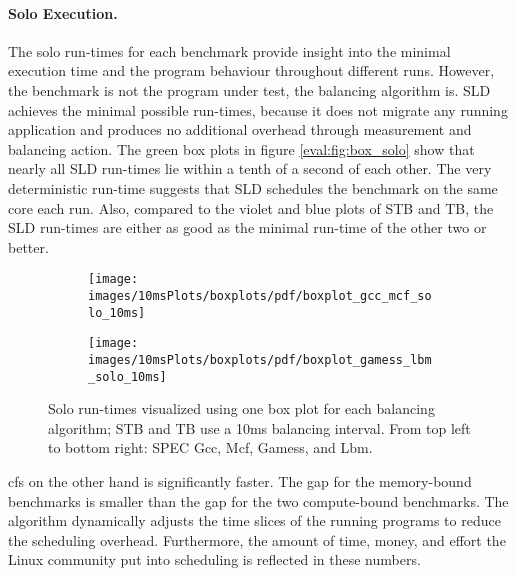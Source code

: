 \paragraph{Solo Execution.}
The solo run-times for each benchmark provide insight into the minimal
execution time and the program behaviour throughout different runs.
However, the benchmark is not the program under test, the balancing algorithm
is.
SLD achieves the minimal possible run-times, because it does not
migrate any running application and produces no additional overhead through
measurement and balancing action.
The green box plots in figure \ref{eval:fig:box_solo} show that nearly all SLD
run-times lie within a tenth of a second of each other.
The very deterministic run-time suggests that SLD schedules the benchmark on
the same core each run.
Also, compared to the violet and blue plots of STB and TB, the SLD run-times
are either as good as the minimal run-time of the other two or better.
\\

\begin{figure}[!ht]
  \begin{subfigure}{\textwidth}
  \texttt{[image: images/10msPlots/boxplots/pdf/boxplot\_gcc\_mcf\_solo\_10ms]}
  \end{subfigure}
  \begin{subfigure}{\textwidth}
  \texttt{[image: images/10msPlots/boxplots/pdf/boxplot\_gamess\_lbm\_solo\_10ms]}
  \end{subfigure}
  \caption{Solo run-times visualized using one box plot for each balancing
    algorithm; STB and TB use a 10ms balancing interval.
    From top left to bottom right: SPEC Gcc, Mcf, Gamess, and Lbm.}
  \label{eval:fig:box_solo_10ms}
\end{figure}


\Gls{cfs} on the other hand is significantly faster.
The gap for the memory-bound benchmarks is smaller than the gap for
the two compute-bound benchmarks.
The algorithm dynamically adjusts the time slices of the running programs to reduce
the scheduling overhead.
Furthermore, the amount of time, money, and effort the Linux community put into
scheduling is reflected in these numbers.
\\

